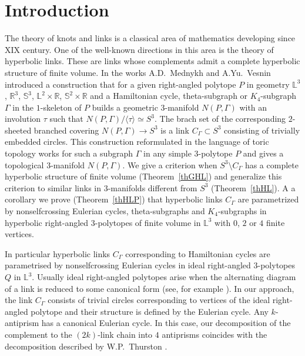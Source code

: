 \documentclass[12pt]{amsart}
\theoremstyle{definition}
\theoremstyle{remark}
\begin{document}
\section{Introduction}
The theory of knots and links is a classical area of mathematics developing since XIX century. 
One of the well-known directions in this area is the theory of hyperbolic links. These are links whose complements admit a complete hyperbolic structure of finite volume.  In the works \cite{M90, VM99S2} A.D.~Mednykh and A.Yu.~Vesnin
introduced a construction  that for a given right-angled polytope $P$ in geometry $\mathbb L^3$, $\mathbb R^3$, $\mathbb S^3$,
$\mathbb L^2\times \mathbb R$, $\mathbb S^2\times \mathbb R$ and a Hamiltonian
cycle, theta-subgraph or $K_4$-subgraph $\Gamma$ in the $1$-skeleton of $P$ builds a geometric
$3$-manifold $N(P,\Gamma)$ with an involution $\tau$ such that $N(P,\Gamma)/\langle\tau\rangle\simeq S^3$.
The brach set of the corresponding $2$-sheeted branched covering $N(P,\Gamma)\to S^3$ is a link $C_\Gamma\subset S^3$
consisting of trivially embedded circles. This construction reformulated in the language of
toric topology works for such a subgraph $\Gamma$ in any simple $3$-polytope $P$ and gives a
topological $3$-manifold $N(P,\Gamma)$. We give a criterion when $S^3\setminus C_\Gamma$ 
has a complete hyperbolic structure of finite volume (Theorem~\ref{thGHL}) and generalize this criterion to
similar links in $3$-manifolds different from $S^3$ (Theorem~\ref{thHL}). A a corollary we prove (Theorem~\ref{thHLP}) that 
hyperbolic links $C_\Gamma$ are parametrized by nonselfcrossing Eulerian cycles, 
theta-subgraphs and $K_4$-subgraphs 
in hyperbolic right-angled $3$-polytopes of finite volume in $\mathbb L^3$ with $0$, $2$ or $4$ finite vertices.  

In particular hyperbolic links $C_\Gamma$ corresponding to Hamiltonian cycles are parametrised by
nonselfcrossing Eulerian cycles in ideal right-angled $3$-polytopes $Q$ in $\mathbb L^3$. Usually ideal right-angled polytopes 
arise when the alternating diagram of a link is reduced to some canonical form (see, for example \cite{CKP22}). 
In our approach, the link $C_\Gamma$ consists of trivial circles
corresponding to vertices of the ideal right-angled polytope and their structure is defined by the Eulerian cycle. 
Any $k$-antiprism has a canonical Eulerian cycle. In this case, our decomposition of the complement
to the $(2k)$-link chain into $4$ antiprisms coincides with the decomposition described by W.P.~Thurston \cite[Example 6.8.7]{T02}.
\end{document}
